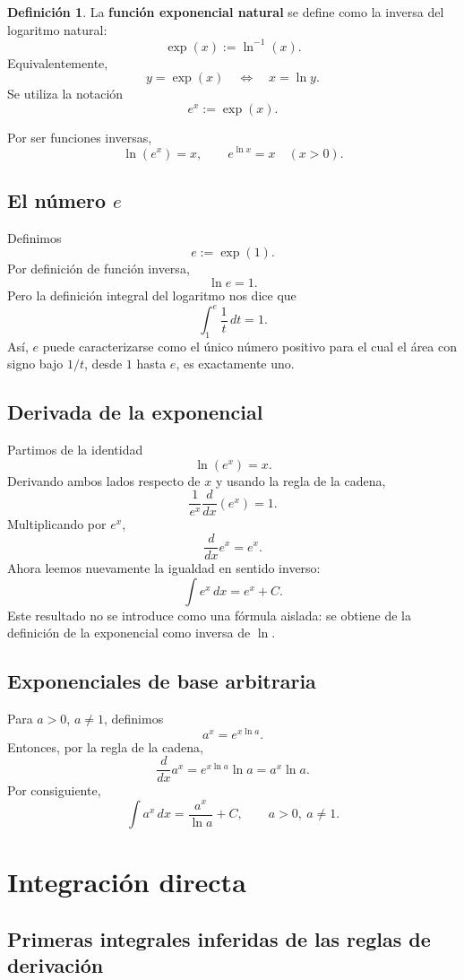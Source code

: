 \documentclass[12pt]{article}
\theoremstyle{definition}\newtheorem{definicion}[teorema]{Definición}\newtheorem{ejemplo}[teorema]{Ejemplo}\newtheorem{ejercicio}[teorema]{Ejercicio}
\theoremstyle{remark}\newtheorem*{observacion}{Observación}\newtheorem*{advertencia}{Advertencia}\newtheorem*{estrategia}{Estrategia}
\begin{document}
\begin{definicion}
La \textbf{función exponencial natural} se define como la inversa del logaritmo natural:
\[
\boxed{\exp(x):=\ln^{-1}(x).}
\]
Equivalentemente,
\[
y=\exp(x)\quad\Longleftrightarrow\quad x=\ln y.
\]
Se utiliza la notación
\[
\boxed{e^x:=\exp(x).}
\]
\end{definicion}
Por ser funciones inversas,
\[
\boxed{\ln(e^x)=x,\qquad e^{\ln x}=x\quad(x>0).}
\]

\subsection{El número $e$}
Definimos
\[
\boxed{e:=\exp(1).}
\]
Por definición de función inversa,
\[
\ln e=1.
\]
Pero la definición integral del logaritmo nos dice que
\[
\boxed{\int_1^e\frac{1}{t}\,dt=1.}
\]
Así, $e$ puede caracterizarse como el único número positivo para el cual el área con signo bajo $1/t$, desde $1$ hasta $e$, es exactamente uno.

\subsection{Derivada de la exponencial}
Partimos de la identidad
\[
\ln(e^x)=x.
\]
Derivando ambos lados respecto de $x$ y usando la regla de la cadena,
\[
\frac{1}{e^x}\frac{d}{dx}(e^x)=1.
\]
Multiplicando por $e^x$,
\[
\boxed{\frac{d}{dx}e^x=e^x.}
\]
Ahora leemos nuevamente la igualdad en sentido inverso:
\[
\boxed{\int e^x\,dx=e^x+C.}
\]
Este resultado no se introduce como una fórmula aislada: se obtiene de la definición de la exponencial como inversa de $\ln$.

\subsection{Exponenciales de base arbitraria}
Para $a>0$, $a\neq1$, definimos
\[
a^x=e^{x\ln a}.
\]
Entonces, por la regla de la cadena,
\[
\frac{d}{dx}a^x=e^{x\ln a}\ln a=a^x\ln a.
\]
Por consiguiente,
\[
\boxed{\int a^x\,dx=\frac{a^x}{\ln a}+C,\qquad a>0,\ a\neq1.}
\]

\section{Integración directa}

\subsection{Primeras integrales inferidas de las reglas de derivación}
\end{document}
